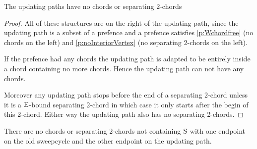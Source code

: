     \begin{lemma}
      The updating paths have no chords or separating $2$-chords
      \label{lm:sweep:augNoIregularity}
    \end{lemma}
    \begin{proof}
        All of these structures are on the right of the updating path, since the updating path is a subset of a prefence and a  prefence satisfies \ref{p:Wchordfree} (no chords on the left) and \ref{p:noInteriorVertex} (no separating 2-chords on the left).

        If the prefence had any chords the updating path is adapted to be entirely inside a chord containing no more chords. Hence the updating path can not have any chords.

        Moreover any updating path stops before the end of a separating 2-chord unless it is a $\mathrm{E}$-bound separating 2-chord in which case it only starts after the begin of this 2-chord. Either way the updating path also has no separating 2-chords.
    \end{proof}

    \begin{lemma}
      \label{lm:sweep:noConnectingIregularity}
      There are no chords or separating $2$-chords not containing $\mathrm{S}$ with one endpoint on the old sweepcycle and the other endpoint on the updating path.
    \end{lemma}

